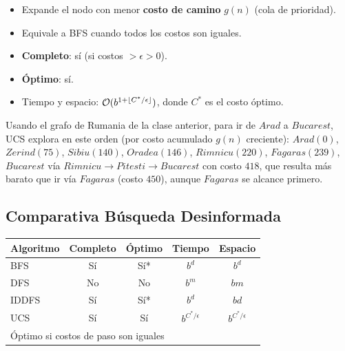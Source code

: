 \begin{itemize}
    \item Expande el nodo con menor \textbf{costo de camino} $g(n)$ (cola de prioridad).
    \item Equivale a BFS cuando todos los costos son iguales.
    \item \textbf{Completo}: sí (si costos $> \epsilon > 0$).
    \item \textbf{Óptimo}: sí.
    \item Tiempo y espacio: $\mathcal{O}(b^{1+\lfloor C^*/\epsilon \rfloor})$, donde $C^*$ es el costo óptimo.
\end{itemize}

\begin{example}
    Usando el grafo de Rumania de la clase anterior, para ir de $Arad$ a $Bucarest$, UCS explora en este orden (por
    costo acumulado $g(n)$ creciente): $Arad(0)$, $Zerind(75)$, $Sibiu(140)$, $Oradea(146)$, $Rimnicu(220)$,
    $Fagaras(239)$, $Bucarest$ vía $Rimnicu \to Pitesti \to Bucarest$ con costo $418$, que resulta más barato que ir
    vía $Fagaras$ (costo $450$), aunque $Fagaras$ se alcance primero.
\end{example}

\subsection{Comparativa Búsqueda Desinformada}

\begin{center}
\begin{tabular}{lcccc}
\toprule
\textbf{Algoritmo} & \textbf{Completo} & \textbf{Óptimo} & \textbf{Tiempo} & \textbf{Espacio} \\
\midrule
BFS      & Sí & Sí* & $b^d$     & $b^d$ \\
DFS      & No & No  & $b^m$     & $bm$ \\
IDDFS    & Sí & Sí* & $b^d$     & $bd$ \\
UCS      & Sí & Sí  & $b^{C^*/\epsilon}$ & $b^{C^*/\epsilon}$ \\
\bottomrule
\multicolumn{5}{l}{\small *Óptimo si costos de paso son iguales}
\end{tabular}
\end{center}
